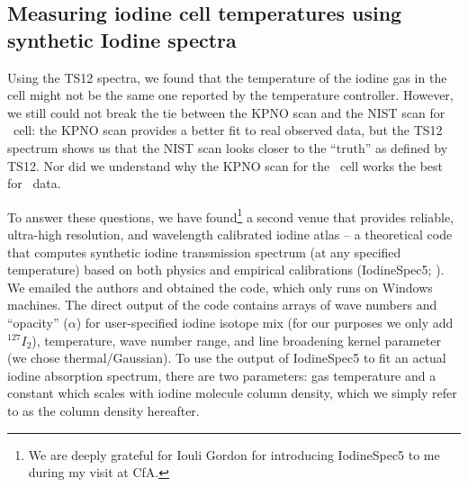 \subsection{Measuring iodine cell temperatures using synthetic Iodine spectra}

Using the TS12 spectra, we found that the temperature of the iodine
gas in the cell might not be the same one reported by the temperature
controller. However, we still could not break the tie between the KPNO
scan and the NIST scan for \het\ cell: the KPNO scan provides a better
fit to real observed data, but the TS12 spectrum shows us that the
NIST scan looks closer to the ``truth'' as defined by TS12. Nor did we
understand why the KPNO scan for the \keck\ cell works the best for
\het\ data.

To answer these questions, we have found\footnote{We are deeply
  grateful for Iouli Gordon for introducing IodineSpec5 to me
  during my visit at CfA.} a second venue that provides
reliable, ultra-high resolution, and wavelength calibrated iodine
atlas -- a theoretical code that computes synthetic iodine
transmission spectrum (at any specified temperature) based on both
physics and empirical calibrations (IodineSpec5;
\citealt{iodinespec5}). We emailed the authors and obtained the code,
which only runs on Windows machines. The direct output of the code
contains arrays of wave numbers and ``opacity'' ($\alpha$) for user-specified
iodine isotope mix (for our purposes we only add $^{127}I_2$),
temperature, wave number range, and line broadening kernel parameter
(we chose thermal/Gaussian). To use the output of IodineSpec5 to fit
an actual iodine absorption spectrum, there are two parameters:
gas temperature and a constant which scales with iodine molecule
column density, which we simply refer to as the column density hereafter.


